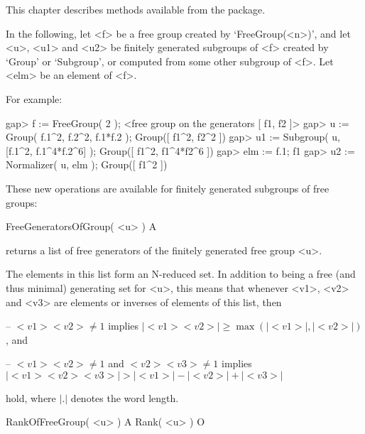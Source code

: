 


This chapter describes methods available from the {\FGA} package.

In the following, let <f> be a free group created by `FreeGroup(<n>)',
and let <u>, <u1> and <u2> be finitely generated subgroups of <f>
created by `Group' or `Subgroup', or computed from some other subgroup
of <f>.  Let <elm> be an element of <f>.

For example:

\beginexample
gap> f := FreeGroup( 2 );                                             
<free group on the generators [ f1, f2 ]>
gap> u := Group( f.1^2, f.2^2, f.1*f.2 );
Group([ f1^2, f2^2 ])
gap> u1 := Subgroup( u, [f.1^2, f.1^4*f.2^6] );
Group([ f1^2, f1^4*f2^6 ])
gap> elm := f.1;
f1
gap> u2 := Normalizer( u, elm );
Group([ f1^2 ])
\endexample


These new operations are available for finitely generated subgroups of
free groups:

\>FreeGeneratorsOfGroup( <u> ) A

returns a list of free generators of the finitely generated free group
<u>.

The elements in this list form an N-reduced set.  In addition to
being a free (and thus minimal) generating set for <u>, this means
that whenever <v1>, <v2> and <v3> are elements or inverses of elements
of this list, then

\beginlist%
  \item{--}
    $<v1><v2>\neq1$ implies $|<v1><v2>|\geq\max(|<v1>|, |<v2>|)$, and
  \item{--}
    $<v1><v2>\neq1$ and $<v2><v3>\neq1$ implies
    $|<v1><v2><v3>| > |<v1>| - |<v2>| + |<v3>|$
\endlist

hold, where $|.|$ denotes the word length.

\>RankOfFreeGroup( <u> ) A
\>Rank( <u> ) O

